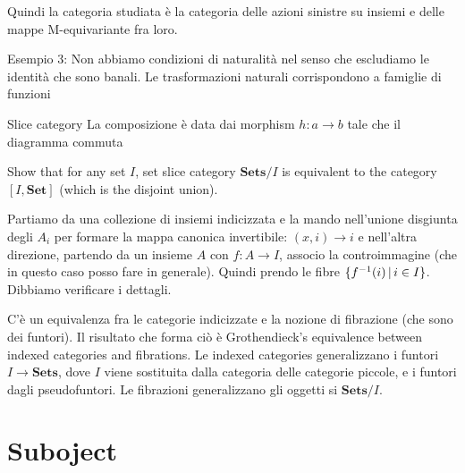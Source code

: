 \documentclass[a4paper]{article}
\begin{document}
Quindi la categoria studiata è la categoria delle azioni sinistre
su insiemi e delle mappe M-equivariante fra loro.

Esempio 3:
Non abbiamo condizioni di naturalità nel senso che escludiamo
le identità che sono banali.
Le trasformazioni naturali corrispondono a famiglie
di funzioni

\begin{snippetdefinition}{Slice category}
    La composizione è data dai morphism \(h\colon a \to b\)
    tale che il diagramma commuta
\end{snippetdefinition}


\begin{snippetexercise}{}
    Show that for any set \(I\),
    set slice category \(\mathbf{Sets}/I\)
    is equivalent to the category \([I, \mathbf{Set}]\)
    (which is the disjoint union).

    Partiamo da una collezione di insiemi indicizzata e la mando
    nell'unione disgiunta degli \(A_i\) per formare la mappa canonica
    invertibile: \((x, i) \to i\) e nell'altra direzione,
    partendo da un insieme \(A\) con \(f \colon A \to I\),
    associo la controimmagine (che in questo caso posso fare in generale).
    Quindi prendo le fibre \(\{f^{-1}(i) \,|\, i \in I\}\).
    Dibbiamo verificare i dettagli.
\end{snippetexercise}

C'è un equivalenza fra le categorie indicizzate e la nozione di fibrazione
(che sono dei funtori).
Il risultato che forma ciò è Grothendieck's equivalence between
indexed categories and fibrations.
Le indexed categories generalizzano i funtori \(I \to \mathbf{Sets}\),
dove \(I\) viene sostituita dalla categoria delle categorie piccole,
e i funtori dagli pseudofuntori.
Le fibrazioni generalizzano gli oggetti si \(\mathbf{Sets}/I\).

\section{Suboject}
\end{document}
